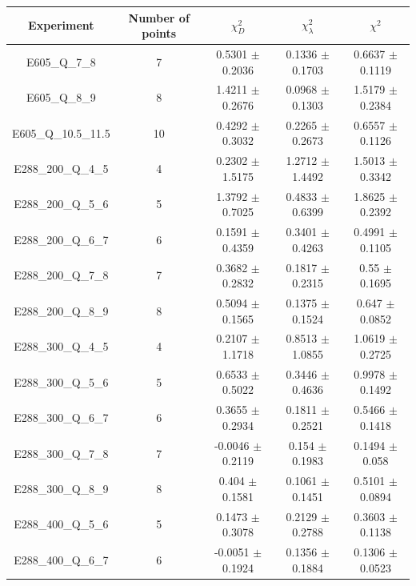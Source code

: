 \documentclass[
]{article}
\begin{document}
\begin{table}[h]

\centering

\begin{tabular}{|c|c|c|c|c|} \hline

\textbf{Experiment} & \textbf{Number of
points} & \textbf{\(\chi_{D}^2\)} & \textbf{\(\chi_{\lambda}^2\)} & \textbf{\(\chi^2\)} \\ \hline

E605\_Q\_7\_8 & 7 & 0.5301 \(\pm\) 0.2036 & 0.1336 \(\pm\)
0.1703 & 0.6637 \(\pm\) 0.1119 \\ \hline
E605\_Q\_8\_9 & 8 & 1.4211 \(\pm\) 0.2676 & 0.0968 \(\pm\)
0.1303 & 1.5179 \(\pm\) 0.2384 \\ \hline
E605\_Q\_10.5\_11.5 & 10 & 0.4292 \(\pm\) 0.3032 & 0.2265 \(\pm\)
0.2673 & 0.6557 \(\pm\) 0.1126 \\ \hline
E288\_200\_Q\_4\_5 & 4 & 0.2302 \(\pm\) 1.5175 & 1.2712 \(\pm\)
1.4492 & 1.5013 \(\pm\) 0.3342 \\ \hline
E288\_200\_Q\_5\_6 & 5 & 1.3792 \(\pm\) 0.7025 & 0.4833 \(\pm\)
0.6399 & 1.8625 \(\pm\) 0.2392 \\ \hline
E288\_200\_Q\_6\_7 & 6 & 0.1591 \(\pm\) 0.4359 & 0.3401 \(\pm\)
0.4263 & 0.4991 \(\pm\) 0.1105 \\ \hline
E288\_200\_Q\_7\_8 & 7 & 0.3682 \(\pm\) 0.2832 & 0.1817 \(\pm\)
0.2315 & 0.55 \(\pm\) 0.1695 \\ \hline
E288\_200\_Q\_8\_9 & 8 & 0.5094 \(\pm\) 0.1565 & 0.1375 \(\pm\)
0.1524 & 0.647 \(\pm\) 0.0852 \\ \hline
E288\_300\_Q\_4\_5 & 4 & 0.2107 \(\pm\) 1.1718 & 0.8513 \(\pm\)
1.0855 & 1.0619 \(\pm\) 0.2725 \\ \hline
E288\_300\_Q\_5\_6 & 5 & 0.6533 \(\pm\) 0.5022 & 0.3446 \(\pm\)
0.4636 & 0.9978 \(\pm\) 0.1492 \\ \hline
E288\_300\_Q\_6\_7 & 6 & 0.3655 \(\pm\) 0.2934 & 0.1811 \(\pm\)
0.2521 & 0.5466 \(\pm\) 0.1418 \\ \hline
E288\_300\_Q\_7\_8 & 7 & -0.0046 \(\pm\) 0.2119 & 0.154 \(\pm\)
0.1983 & 0.1494 \(\pm\) 0.058 \\ \hline
E288\_300\_Q\_8\_9 & 8 & 0.404 \(\pm\) 0.1581 & 0.1061 \(\pm\)
0.1451 & 0.5101 \(\pm\) 0.0894 \\ \hline
E288\_400\_Q\_5\_6 & 5 & 0.1473 \(\pm\) 0.3078 & 0.2129 \(\pm\)
0.2788 & 0.3603 \(\pm\) 0.1138 \\ \hline
E288\_400\_Q\_6\_7 & 6 & -0.0051 \(\pm\) 0.1924 & 0.1356 \(\pm\)
0.1884 & 0.1306 \(\pm\) 0.0523 \\ \hline

\end{tabular}
\end{table}
\end{document}
